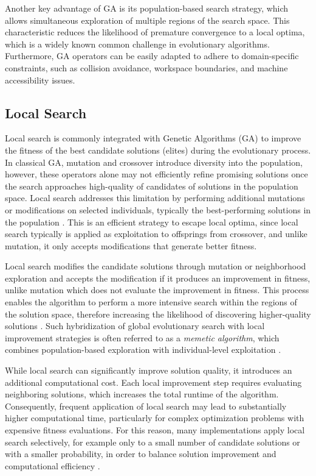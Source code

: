 \documentclass{article}
\begin{document}
Another key advantage of GA is its population-based search strategy, which allows simultaneous exploration of multiple regions of the search space. This characteristic reduces the likelihood of premature convergence to a local optima, which is a widely known common challenge in evolutionary algorithms. Furthermore, GA operators can be easily adapted to adhere to domain-specific constraints, such as collision avoidance, workspace boundaries, and machine accessibility issues.

\subsection{Local Search}
Local search is commonly integrated with Genetic Algorithms (GA) to improve the fitness of the best candidate solutions (elites) during the evolutionary process. In classical GA, mutation and crossover introduce diversity into the population, however, these operators alone may not efficiently refine promising solutions once the search approaches high-quality of candidates of solutions in the population space. Local search addresses this limitation by performing additional mutations or modifications on selected individuals, typically the best-performing solutions in the population \parencite{talbi2009metaheuristics}. This is an efficient strategy to escape local optima, since local search typically is applied as exploitation to offsprings from crossover, and unlike mutation, it only accepts modifications that generate better fitness.

Local search modifies the candidate solutions through mutation or neighborhood exploration and accepts the modification if it produces an improvement in fitness, unlike mutation which does not evaluate the improvement in fitness. This process enables the algorithm to perform a more intensive search within the regions of the solution space, therefore increasing the likelihood of discovering higher-quality solutions \parencite{blum2003metaheuristics}. Such hybridization of global evolutionary search with local improvement strategies is often referred to as a \textit{memetic algorithm}, which combines population-based exploration with individual-level exploitation \parencite{moscato1989memetic}.

While local search can significantly improve solution quality, it introduces an additional computational cost. Each local improvement step requires evaluating neighboring solutions, which increases the total runtime of the algorithm. Consequently, frequent application of local search may lead to substantially higher computational time, particularly for complex optimization problems with expensive fitness evaluations. For this reason, many implementations apply local search selectively, for example only to a small number of candidate solutions or with a smaller probability, in order to balance solution improvement and computational efficiency \parencite{talbi2009metaheuristics}.
\end{document}
